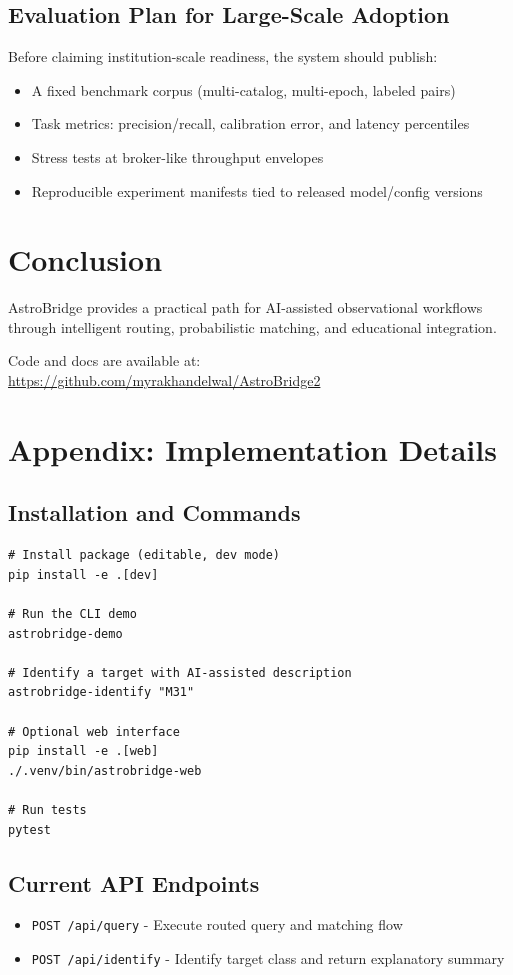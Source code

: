\documentclass[10pt]{article}
\newcommand{\astron}[1]{\textcolor{astroorange}{#1}}
\newcommand{\code}[1]{\texttt{#1}}
\begin{document}
\subsection{Evaluation Plan for Large-Scale Adoption}
Before claiming institution-scale readiness, the system should publish:

\begin{itemize}
    \item A fixed benchmark corpus (multi-catalog, multi-epoch, labeled pairs)
    \item Task metrics: precision/recall, calibration error, and latency percentiles
    \item Stress tests at broker-like throughput envelopes
    \item Reproducible experiment manifests tied to released model/config versions
\end{itemize}

\section{Conclusion}
\label{sec:conclusion}

\astron{AstroBridge} provides a practical path for AI-assisted observational workflows through intelligent routing, probabilistic matching, and educational integration.

Code and docs are available at:
\url{https://github.com/myrakhandelwal/AstroBridge2}

\appendix
\section{Appendix: Implementation Details}

\subsection{Installation and Commands}
\begin{lstlisting}[caption={AstroBridge Installation and Commands}]
# Install package (editable, dev mode)
pip install -e .[dev]

# Run the CLI demo
astrobridge-demo

# Identify a target with AI-assisted description
astrobridge-identify "M31"

# Optional web interface
pip install -e .[web]
./.venv/bin/astrobridge-web

# Run tests
pytest
\end{lstlisting}

\subsection{Current API Endpoints}
\begin{itemize}
    \item \code{POST /api/query} - Execute routed query and matching flow
    \item \code{POST /api/identify} - Identify target class and return explanatory summary
\end{itemize}



\end{document}
